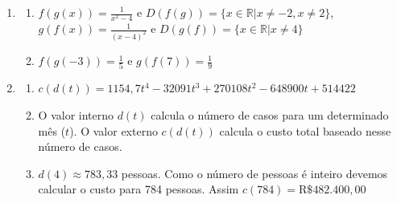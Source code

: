 \begin{enumerate}
\item
\begin{enumerate}
\item  $f(g(x))= \frac{1}{x^2-4}$ e $D(f(g))=\{ x \in \mathbb{R}| x \neq -2, x \neq 2 \}$, $g(f(x))=\frac{1}{(x-4)^2}$ e $D(g(f))=\{ x \in \mathbb{R}| x \neq 4\}$ \\
\item  $f(g(-3))= \frac{1}{5}$ e $g(f(7))= \frac{1}{9}$
\end{enumerate}

\item
\begin{enumerate}
    \item $c(d(t)) = 1154,7t^4 - 32091t^3 + 270108t^2 - 648900t + 514422$
    \item O valor interno $d(t)$ calcula o número de casos para um determinado mês ($t$).
    O valor externo $c(d(t))$ calcula o custo total baseado nesse número de casos.
    \item $d(4) \approx783,33$ pessoas. Como o número de pessoas é inteiro devemos calcular o custo para 784 pessoas. Assim $c(784) = \text{R\$ } 482.400,00$
\end{enumerate}
\end{enumerate}

